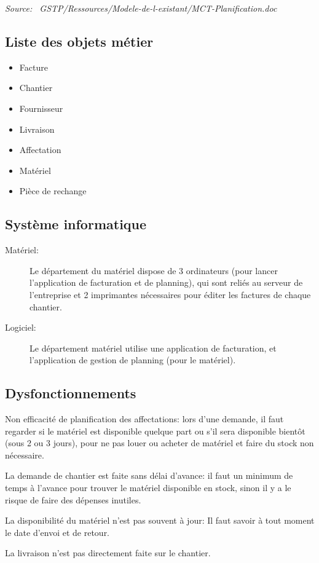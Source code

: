     {\sl Source:~{\ttfamily 
        GSTP/Ressources/Modele-de-l-existant/MCT-Planification.doc}}


\subsection{Liste des objets métier}

    \begin{itemize}
    	\item Facture
    	\item Chantier
    	\item Fournisseur
    	\item Livraison
    	\item Affectation
    	\item Matériel
    	\item Pièce de rechange
    \end{itemize}

\subsection{Système informatique}

    \begin{description}
        \item [Matériel:]\el 
            Le département du matériel dispose de 3 ordinateurs (pour lancer
            l'application de facturation et de planning), qui sont reliés au
            serveur de l'entreprise et 2 imprimantes nécessaires pour
            éditer les factures de chaque chantier.

        \item [Logiciel:]\el
            Le département matériel utilise une application de facturation,
            et l'application de gestion de planning (pour le matériel).
    \end{description}

\subsection{Dysfonctionnements}

    Non efficacité de planification des affectations: lors d'une demande,
    il faut regarder si le matériel est disponible quelque part ou s'il sera
    disponible bientôt (sous 2 ou 3 jours), pour ne pas louer ou acheter de
    matériel et faire du stock non nécessaire.

    La demande de chantier est faite sans délai d'avance: il faut un minimum
    de temps à l'avance pour trouver le matériel disponible en stock, sinon
    il y a le risque de faire des dépenses inutiles.

    La disponibilité du matériel n'est pas souvent à jour: Il faut savoir à
    tout moment le date d'envoi et de retour.

    La livraison n'est pas directement faite sur le chantier.

\vfil
\pagebreak


